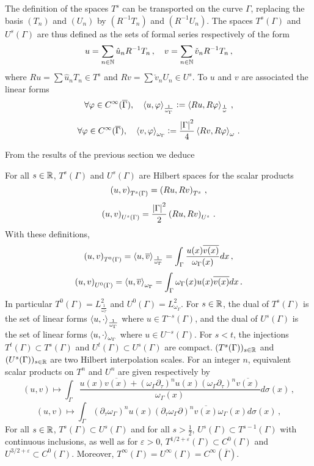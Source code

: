\documentclass[a4paper]{article}
\begin{document}
The definition of the spaces $T^s$ can be transported on the curve $\Gamma$, replacing the basis $(T_n)$ and $(U_n)$ by $(R^{-1}T_n)$ and $(R^{-1}U_n)$. The spaces $T^s(\Gamma)$ and $U^s(\Gamma)$ are thus defined as the sets of formal series respectively of the form 
\[u = \sum_{n \in \mathbb{N}} \hat{u}_n R^{-1}T_n\,, \quad v = \sum_{n \in \mathbb{N}} \check{v}_n R^{-1}T_n\,,\]
where $Ru = \sum\hat{u}_n T_n \in T^s$ and $Rv = \sum\check{v}_n U_n  \in U^s$. To $u$ and $v$ are associated the linear forms 
\[\forall \varphi \in C^{\infty}(\overline{\Gamma}), \quad \left\langle u,\varphi\right\rangle_\frac{1}{\omega_\Gamma} \mathrel{\mathop:}= \left\langle Ru,R\varphi\right\rangle_\frac{1}{\omega}\,,\]
\[\forall \varphi \in C^{\infty}(\overline{\Gamma}), \quad \left\langle v,\varphi\right\rangle_{\omega_\Gamma} \mathrel{\mathop:}= \frac{\left\lvert \Gamma \right\rvert^2}{4}\left\langle Rv,R\varphi\right\rangle_{\omega}\,.\] 

 
\noindent From the results of the previous section we deduce
\begin{Lem} For all $s \in \mathbb{R}$, $T^s(\Gamma)$ and $U^s(\Gamma)$ are Hilbert spaces for the scalar products 
\[\left( u,v\right)_{T^s(\Gamma)} = \left( Ru,Rv\right)_{T^s}\,,\]
\[\left( u,v\right)_{U^s(\Gamma)} = \frac{\left\lvert \Gamma \right\rvert^2}{2}\left( Ru,Rv\right)_{U^s}\,.\]
With these definitions, 
\[\left( u,v\right)_{T^0(\Gamma)} = \left\langle u,\overline{v}\right\rangle_\frac{1}{\omega_\Gamma} = \int_{\Gamma} \frac{u(x) \overline{v(x)}}{ \omega_\Gamma(x)} dx\,,\]
\[\left( u,v\right)_{U^0(\Gamma)} = \left\langle u,\overline{v}\right\rangle_{\omega_\Gamma}  = \int_{\Gamma} \omega_\Gamma(x) u(x) \overline{v(x)} dx\,.\]
In particular $T^0(\Gamma) = L^2_\frac{1}{\omega_\Gamma}$ and $U^0(\Gamma) = L^2_{\omega_\Gamma}$. For $s \in \mathbb{R}$, the dual of $T^s(\Gamma)$ is the set of linear forms $\left\langle u,\cdot\right\rangle_\frac{1}{\omega_\Gamma}$ where $u\in T^{-s}(\Gamma)$, and the dual of $U^s(\Gamma)$ is the set of linear forms $\left\langle u,\cdot\right\rangle_{\omega_\Gamma}$ where $u \in U^{-s}(\Gamma)$. 
For $s < t$, the injections $T^t(\Gamma) \subset T^s(\Gamma)$ and $U^t(\Gamma) \subset U^s(\Gamma)$ are compact. $(T^s(\Gamma))_{s\in \mathbb{R}}$ and $(U^s(\Gamma))_{s\in \mathbb{R}}$ are two Hilbert interpolation scales. For an integer $n$, equivalent scalar products on $T^n$ and $U^n$ are given respectively by
\[(u,v) \mapsto \int_{\Gamma} \frac{u(x)\overline{v(x)} + (\omega_\Gamma \partial_\tau)^n u(x) (\omega_\Gamma \partial_\tau)^n \overline{v(x)}}{\omega_\Gamma(x)}d\sigma(x)\,,\]
\[(u,v) \mapsto \int_{\Gamma}(\partial_\tau\omega_\Gamma )^n u(x) (\partial_\tau\omega_\Gamma \partial)^n \overline{v(x)}\omega_\Gamma(x)d\sigma(x)\,,\]
For all $s \in \mathbb{R}$, $T^s(\Gamma) \subset U^s(\Gamma)$ and for all $s > \frac{1}{2}$, $U^s(\Gamma) \subset T^{s-1}(\Gamma)$ with continuous inclusions, as well as for $\varepsilon > 0$, $T^{1/2 + \varepsilon}(\Gamma) \subset C^0(\Gamma)$ and $U^{3/2+\varepsilon} \subset C^0(\Gamma)$. Moreover, $T^\infty(\Gamma) = U^\infty(\Gamma) = C^\infty(\overline{\Gamma})$. 
\end{Lem}
\end{document}
